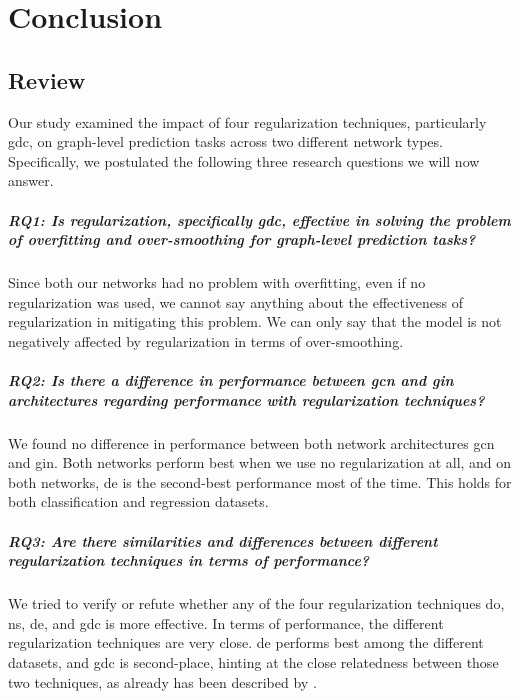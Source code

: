 %
\chapter{Conclusion}
\label{sec:conclusion}




\section{Review}
\label{sec:conclusion:review}

Our study examined the impact of four regularization techniques, particularly \ac{gdc}, on graph-level prediction tasks across two different network types.
Specifically, we postulated the following three research questions we will now answer.

\paragraph{RQ1: Is regularization, specifically \acs*{gdc}, effective in solving the problem of overfitting and over-smoothing for graph-level prediction tasks?}
Since both our networks had no problem with overfitting, even if no regularization was used, we cannot say anything about the effectiveness of regularization in mitigating this problem.
We can only say that the model is not negatively affected by regularization in terms of over-smoothing.

\paragraph{RQ2: Is there a difference in performance between \acs*{gcn} and \acs*{gin} architectures regarding performance with regularization techniques?}

We found no difference in performance between both network architectures \ac{gcn} and \ac{gin}.
Both networks perform best when we use no regularization at all, and on both networks, \ac{de} is the second-best performance most of the time.
This holds for both classification and regression datasets.


\paragraph{RQ3: Are there similarities and differences between different regularization techniques in terms of performance?}
We tried to verify or refute whether any of the four regularization techniques \ac{do}, \ac{ns}, \ac{de}, and \ac{gdc} is more effective.
In terms of performance, the different regularization techniques are very close.
\Ac{de} performs best among the different datasets, and \ac{gdc} is second-place, hinting at the close relatedness between those two techniques, as already has been described by \citep{Hasanzadeh2020}.


